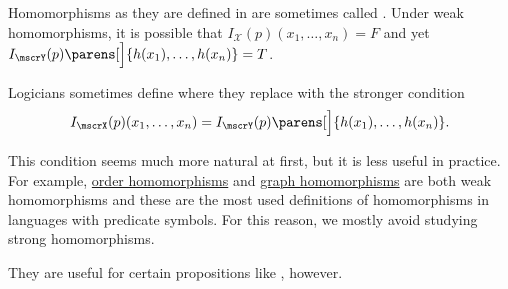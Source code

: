 \begin{remark}\label{rem:first_order_strong_homomorphism}
  Homomorphisms as they are defined in  are sometimes called . Under weak homomorphisms, it is possible that \( I_\mscrX(p) (x_1, \ldots, x_n) = F \) and yet \( I_\mscrY(p) \parens[\Big]{ h(x_1), \ldots, h(x_n) } = T \).

  Logicians sometimes define  where they replace  with the stronger condition
  \begin{equation*}
    I_\mscrX(p) (x_1, \ldots, x_n) = I_\mscrY(p) \parens[\Big]{ h(x_1), \ldots, h(x_n) }.
  \end{equation*}

  This condition seems much more natural at first, but it is less useful in practice. For example, \hyperref[def:partially_ordered_set/homomorphism]{order homomorphisms} and \hyperref[def:directed_graph/homomorphism]{graph homomorphisms} are both weak homomorphisms and these are the most used definitions of homomorphisms in languages with predicate symbols. For this reason, we mostly avoid studying strong homomorphisms.

  They are useful for certain propositions like , however.
\end{remark}

